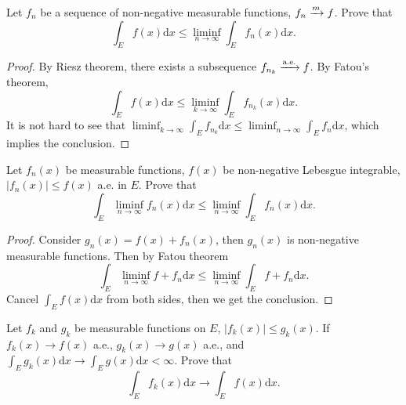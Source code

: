 \begin{exercise}{}{}
  Let $f_n$ be a sequence of non-negative measurable functions,
  $f_n \xrightarrow{m} f$. Prove that
  \begin{equation}
    \int_E f(x) \mathrm{d} x \leq \liminf _{n \rightarrow \infty} \int_E f_n(x)\mathrm{d} x.
  \end{equation}
\end{exercise}

\begin{proof}
  By Riesz theorem, there exists a subsequence $f_{n_k} \xrightarrow{\text{a.e.}} f$.
  By Fatou's theorem,
  \begin{equation}
    \int_E f(x)\mathrm{d} x \leq \liminf_{k \rightarrow \infty} \int_E f_{n_k}(x)\mathrm{d} x.
  \end{equation}
  It is not hard to see that
  $\liminf_{k \rightarrow \infty} \int_E f_{n_k}\mathrm{d} x \leq \liminf_{n \rightarrow \infty} \int_E f_n \mathrm{d} x$,
  which implies the conclusion.
\end{proof}

\begin{exercise}{}{}
  Let $f_n(x)$ be measurable functions, $f(x)$ be non-negative Lebesgue integrable,
  $|f_n(x)| \leq f(x)$ a.e. in $E$. Prove that
  \begin{equation}
    \int_E \liminf_{n \rightarrow \infty} f_n(x) \mathrm{d} x \leq \liminf _{n \rightarrow \infty} \int_E f_n(x)\mathrm{d} x.
  \end{equation}
\end{exercise}

\begin{proof}
  Consider $g_n(x) = f(x) + f_n(x)$, then $g_n(x)$ is non-negative measurable functions.
  Then by Fatou theorem
  \begin{equation}
    \int_E \liminf_{n \rightarrow \infty} f + f_n \mathrm{d} x
    \leq \liminf_{n \rightarrow \infty} \int_E f + f_n \mathrm{d} x.
  \end{equation}
  Cancel $\int_E f(x)\mathrm{d} x$ from both sides, then we get the conclusion.
\end{proof}

\begin{exercise}{}{}
  Let $f_k$ and $g_k$ be measurable functions on $E$,
  $|f_k(x)| \leq g_k(x)$.
  If $f_k(x) \rightarrow f(x)$ a.e., $g_k(x) \rightarrow g(x)$ a.e.,
  and $\int_E g_k(x)\mathrm{d} x \rightarrow \int_E g(x)\mathrm{d} x < \infty$.
  Prove that
  \begin{equation}
    \int_E f_k(x)\mathrm{d} x \rightarrow \int_E f(x)\mathrm{d}x.
  \end{equation}
\end{exercise}

